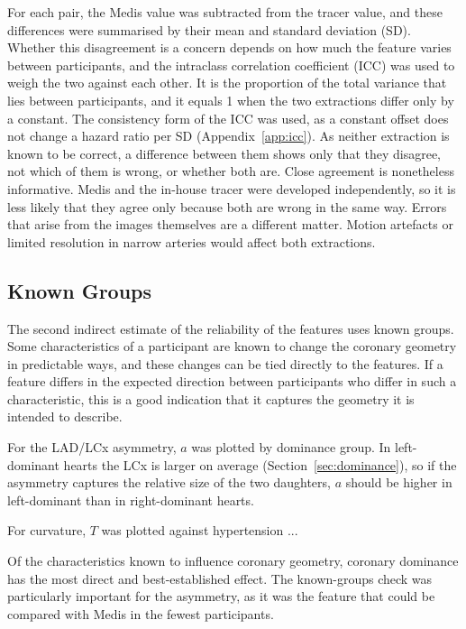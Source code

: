 For each pair, the Medis value was subtracted from the tracer value, and these differences were summarised by their mean and standard deviation (SD).
Whether this disagreement is a concern depends on how much the feature varies between participants, and the intraclass correlation coefficient (ICC) was used to weigh the two against each other.
It is the proportion of the total variance that lies between participants, and it equals 1 when the two extractions differ only by a constant.
The consistency form of the ICC was used, as a constant offset does not change a hazard ratio per SD (Appendix~\ref{app:icc}).
As neither extraction is known to be correct, a difference between them shows only that they disagree, not which of them is wrong, or whether both are.
Close agreement is nonetheless informative.
Medis and the in-house tracer were developed independently, so it is less likely that they agree only because both are wrong in the same way.
Errors that arise from the images themselves are a different matter.
Motion artefacts or limited resolution in narrow arteries would affect both extractions.


\subsection{Known Groups}
\label{sec:method-validity-groups}
\label{sec:method-validity-dominance}

The second indirect estimate of the reliability of the features uses known groups.
Some characteristics of a participant are known to change the coronary geometry in predictable ways, and these changes can be tied directly to the features.
If a feature differs in the expected direction between participants who differ in such a characteristic, this is a good indication that it captures the geometry it is intended to describe.

For the LAD/LCx asymmetry, $a$ was plotted by dominance group.
In left-dominant hearts the LCx is larger on average (Section~\ref{sec:dominance}), so if the asymmetry captures the relative size of the two daughters, $a$ should be higher in left-dominant than in right-dominant hearts.

For curvature, $T$ was plotted against hypertension ...

Of the characteristics known to influence coronary geometry, coronary dominance has the most direct and best-established effect.
The known-groups check was particularly important for the asymmetry, as it was the feature that could be compared with Medis in the fewest participants.
